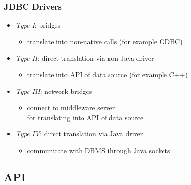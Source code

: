 \documentclass[dvipsnames]{beamer}
\theoremstyle{plain}
\begin{document}
\begin{frame}
  \frametitle{JDBC Drivers}

  \begin{itemize}
    \item \emph{Type I}: bridges
    \begin{itemize}
      \item translate into non-native calls (for example ODBC)
    \end{itemize}

    \pause
    \item \emph{Type II}: direct translation via non-Java driver
    \begin{itemize}
      \item translate into API of data source (for example C++)
    \end{itemize}

    \pause
    \item \emph{Type III}: network bridges
    \begin{itemize}
      \item connect to middleware server\\
	for translating into API of data source
    \end{itemize}

    \pause
    \item \emph{Type IV}: direct translation via Java driver
    \begin{itemize}
      \item communicate with DBMS through Java sockets
    \end{itemize}
  \end{itemize}
\end{frame}

\subsection{API}
\end{document}
